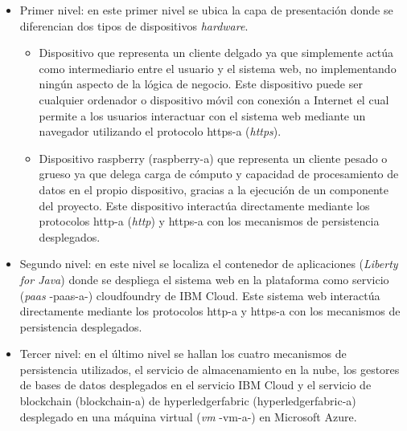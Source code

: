 \documentclass[12pt,a4paper, twoside]{report}
\begin{document}
	\begin{itemize}
		\item Primer nivel: en este primer nivel se ubica la capa de presentación donde se diferencian dos tipos de dispositivos \textit{hardware}.
			\begin{itemize}
				\item Dispositivo que representa un cliente delgado ya que simplemente actúa como intermediario entre el usuario y el sistema web, no implementando ningún aspecto de la lógica de negocio. Este dispositivo puede ser cualquier ordenador o dispositivo móvil con conexión a Internet el cual permite a los usuarios interactuar con el sistema web mediante un navegador utilizando el protocolo \gls{https-a} (\textit{\gls{https}}).
				\item Dispositivo \gls{raspberry} (\gls{raspberry-a}) que representa un cliente pesado o grueso ya que delega carga de cómputo y capacidad de procesamiento de datos en el propio dispositivo, gracias a la ejecución de un componente del proyecto. Este dispositivo interactúa directamente mediante los protocolos \gls{http-a} (\textit{\gls{http}}) y \gls{https-a} con los mecanismos de persistencia desplegados.
			\end{itemize}
				 		
		\item Segundo nivel: en este nivel se localiza el contenedor de aplicaciones (\textit{Liberty for Java}) donde se despliega el sistema web en la plataforma como servicio (\textit{\gls{paas}} -\gls{paas-a}-) \cite{gonzalez:2011:TCCS} \gls{cloudfoundry} de IBM Cloud. Este sistema web interactúa directamente mediante los protocolos \gls{http-a} y  \gls{https-a} con los mecanismos de persistencia desplegados.
		
		\item Tercer nivel: en el último nivel se hallan los cuatro mecanismos de persistencia utilizados, el servicio de almacenamiento en la nube, los gestores de bases de datos desplegados en el servicio IBM Cloud y el servicio de \Gls{blockchain} (\gls{blockchain-a}) de \gls{hyperledgerfabric} (\gls{hyperledgerfabric-a}) desplegado en una máquina virtual (\textit{\gls{vm}} -\gls{vm-a}-) en Microsoft Azure.
	\end{itemize}
	  
\end{document}
